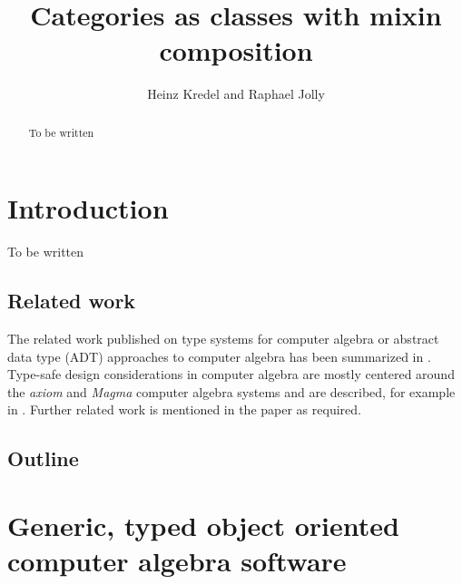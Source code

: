 \documentclass{llncs}
\begin{document}
\title{Categories as classes with mixin composition}

\author{Heinz Kredel and Raphael Jolly} 

\maketitle

\begin{abstract} 
  To be written
\end{abstract}



\section{Introduction} %

To be written

\subsection{Related work} %

The related work published on type systems for computer algebra or
abstract data type (ADT) approaches to computer algebra has been
summarized in \cite{JollyKredel:2010,JollyKredel:2011}.  Type-safe
design considerations in computer algebra are mostly centered around
the {\em axiom} and {\em Magma} computer algebra systems and are
described, for example in
\cite{JenksSutor:1992,Watt:2003,BosmaCannonPlayoust:1997,Stein:2005,SageWiki:2009}.
%
Further related work is mentioned in the paper as required.


\subsection{Outline} %



\section{Generic, typed object oriented computer algebra software} %
\label{sec:asto}
\end{document}
